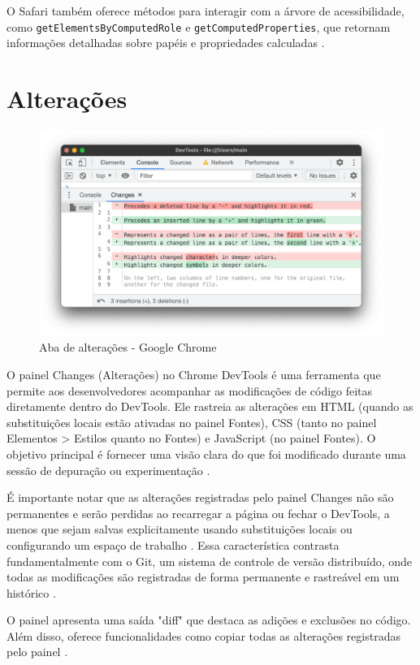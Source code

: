 O Safari também oferece métodos para interagir com a árvore de acessibilidade, como \texttt{getElementsByComputedRole} e \texttt{getComputedProperties}, que retornam informações detalhadas sobre papéis e propriedades calculadas \cite{apple}.

\section{Alterações}
\begin{figure}[h!]
    \centering
    \includegraphics[width=0.7\linewidth]{assets/tools/changes-chrome.png}
    \caption{Aba de alterações - Google Chrome}
    \label{fig:enter-label}
\end{figure}
O painel Changes (Alterações) no Chrome DevTools é uma ferramenta que permite aos desenvolvedores acompanhar as modificações de código feitas diretamente dentro do DevTools. Ele rastreia as alterações em HTML (quando as substituições locais estão ativadas no painel Fontes), CSS (tanto no painel Elementos > Estilos quanto no Fontes) e JavaScript (no painel Fontes). O objetivo principal é fornecer uma visão clara do que foi modificado durante uma sessão de depuração ou experimentação \cite{chrome}.

É importante notar que as alterações registradas pelo painel Changes não são permanentes e serão perdidas ao recarregar a página ou fechar o DevTools, a menos que sejam salvas explicitamente usando substituições locais ou configurando um espaço de trabalho \cite{chrome}. Essa característica contrasta fundamentalmente com o Git, um sistema de controle de versão distribuído, onde todas as modificações são registradas de forma permanente e rastreável em um histórico \cite{git}. 

O painel apresenta uma saída "diff" que destaca as adições e exclusões no código. Além disso, oferece funcionalidades como copiar todas as alterações registradas pelo painel \cite{chrome}.

